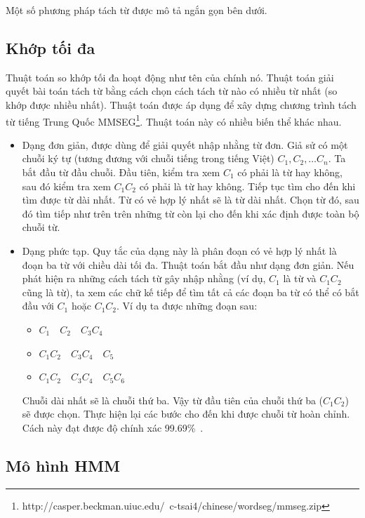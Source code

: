 \documentclass[a4paper,oneside,14pt]{extbook} %
\begin{document}
Một số phương pháp tách từ được mô tả ngắn gọn bên dưới.

\subsection{Khớp tối đa}

Thuật toán so khớp tối đa hoạt động như tên của chính nó. Thuật toán
giải quyết bài toán tách từ bằng cách chọn cách tách từ nào có nhiều
từ nhất (so khớp được nhiều nhất). Thuật toán được áp dụng để xây dựng
chương trình tách từ tiếng Trung Quốc
MMSEG\footnote{http://casper.beckman.uiuc.edu/~c-tsai4/chinese/wordseg/mmseg.zip}.
Thuật toán này có nhiều biến thể khác nhau. 


\begin{itemize}
\item Dạng đơn giản, được dùng để giải quyết nhập nhằng từ đơn. Giả sử
  có một chuỗi ký tự (tương đương với chuỗi tiếng trong tiếng Việt)
  $C_1, C_2, \ldots{} C_n$. Ta bắt đầu từ đầu   chuỗi. Đầu tiên, kiểm
  tra xem $C_1$ có phải là từ hay không, sau đó kiểm tra xem $C_1C_2$
  có phải là từ hay không. Tiếp tục tìm cho đến khi tìm được từ dài
  nhất. Từ có vẻ hợp lý nhất sẽ là từ dài nhất. Chọn từ đó, sau đó tìm
  tiếp như trên trên những từ còn lại cho đến khi xác định được toàn
  bộ chuỗi từ.
\item Dạng phức tạp. Quy tắc của dạng này là phân đoạn có vẻ hợp lý
  nhất là đoạn ba từ với chiều dài tối đa. Thuật toán bắt đầu như dạng
  đơn giản. Nếu phát hiện ra những cách tách từ gây nhập nhằng (ví dụ,
  $C_1$ là từ và $C_1C_2$ cũng là từ), ta xem các chữ kế tiếp để tìm
  tất cả các đoạn ba từ có thể có bắt đầu với $C_1$ hoặc $C_1C_2$. Ví
  dụ ta được những đoạn sau: 
  \begin{itemize}
  \item $C_1\quad C_2\quad C_3C_4$
  \item $C_1C_2\quad C_3C_4\quad C_5$
  \item $C_1C_2\quad C_3C_4\quad C_5C_6$
  \end{itemize}
  Chuỗi dài nhất sẽ là chuỗi thứ ba. Vậy từ
  đầu tiên của chuỗi thứ ba ($C_1C_2$) sẽ được chọn. Thực hiện lại các
  bước cho đến khi được chuỗi từ hoàn chỉnh. Cách này đạt được độ
  chính xác 99.69\%~\cite{ChenLiu}.
\end{itemize}



\subsection{Mô hình HMM}
\end{document}
